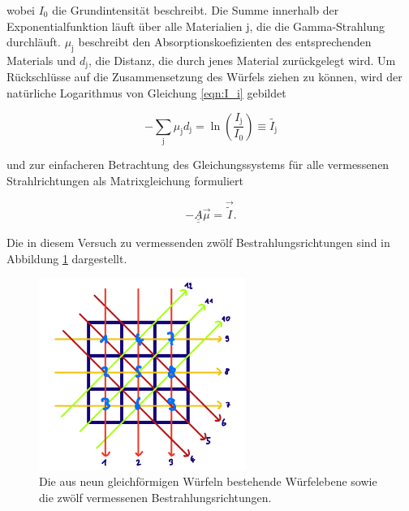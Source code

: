           wobei $I_0$ die Grundintensität beschreibt. Die Summe innerhalb der Exponentialfunktion läuft über alle Materialien j, die die Gamma-Strahlung durchläuft. $\mu_{\text{j}}$ beschreibt den 
          Absorptionskoefizienten des entsprechenden Materials und $d_{\text{j}}$, die Distanz, die durch jenes Material zurückgelegt wird. Um Rückschlüsse auf die Zusammensetzung des Würfels ziehen zu können,
          wird der natürliche Logarithmus von Gleichung \ref{eqn:I_i} gebildet
          
          \begin{equation}
            -\sum_{\text{j}} \mu_{\text{j}} d_{\text{j}} = \ln\left(\frac{I_{\text{j}}}{I_0}\right) \equiv \tilde{I_{\text{j}}}
          \end{equation}

          und zur einfacheren Betrachtung des Gleichungssystems für alle vermessenen Strahlrichtungen als Matrixgleichung formuliert

          \begin{equation}
            -\underline{\underline{A}} \vec{\mu} = \vec{\tilde{I}}.
            \label{eqn:I_matrix}
          \end{equation}

          Die in diesem Versuch zu vermessenden zwölf Bestrahlungsrichtungen sind in Abbildung \ref{fig:Richtungen} dargestellt.

          \FloatBarrier

          \begin{figure}[h]
            \centering
            \includegraphics[width = 0.6\textwidth]{pictures/richtungen.png}
            \caption{Die aus neun gleichförmigen Würfeln bestehende Würfelebene sowie die zwölf vermessenen Bestrahlungsrichtungen.}
            \label{fig:Richtungen}
          \end{figure}
      
